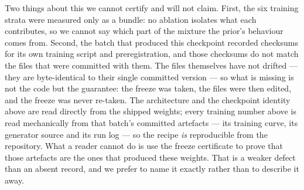 \documentclass[review]{elsarticle}
\begin{document}
Two things about this we cannot certify and will not claim. First, the six training
strata were measured only as a bundle: no ablation isolates what each contributes,
so we cannot say which part of the mixture the prior's behaviour comes from.
Second, the batch that produced this checkpoint recorded checksums for its own
training script and preregistration, and those checksums do not match the files that
were committed with them. The files themselves have not drifted --- they are
byte-identical to their single committed version --- so what is missing is not the
code but the guarantee: the freeze was taken, the files were then edited, and the
freeze was never re-taken. The architecture and the checkpoint identity above are
read directly from the shipped weights; every training number above is read
mechanically from that batch's committed artefacts --- its training curve, its
generator source and its run log --- so the recipe \emph{is} reproducible from the
repository. What a reader cannot do is use the freeze certificate to prove that
those artefacts are the ones that produced these weights. That is a weaker defect
than an absent record, and we prefer to name it exactly rather than to describe it
away.
\end{document}
